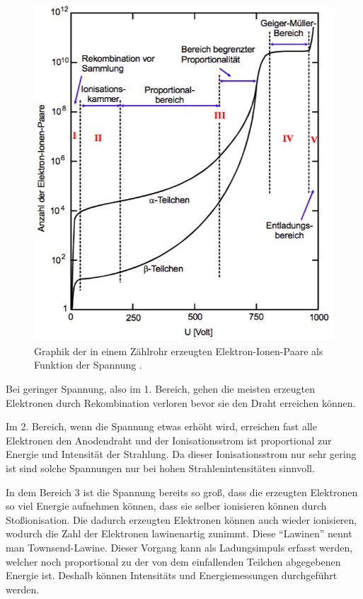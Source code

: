 \begin{figure}[H]
  \centering
  \includegraphics[width=\textwidth]{content/Primaerionisation.png}
  \caption{Graphik der in einem Zählrohr erzeugten Elektron-Ionen-Paare als Funktion
  der Spannung \cite{1}.}
  \label{abb:2}
\end{figure}

Bei geringer Spannung, also im 1. Bereich, gehen die meisten erzeugten Elektronen
durch Rekombination verloren bevor sie den Draht erreichen können.

Im 2. Bereich, wenn die Spannung etwas erhöht wird, erreichen fast alle Elektronen
den Anodendraht und der Ionisationsstrom ist proportional zur Energie und Intensität
der Strahlung. Da dieser Ionisationsstrom nur sehr gering ist sind solche Spannungen
nur bei hohen Strahlenintensitäten sinnvoll.

In dem Bereich 3 ist die Spannung bereits so groß, dass die erzeugten Elektronen
so viel Energie aufnehmen können, dass sie selber ionisieren können durch Stoßionisation.
Die dadurch erzeugten Elektronen können auch wieder ionisieren, wodurch die Zahl der Elektronen
lawinenartig zunimmt. Diese \enquote{Lawinen} nennt man Townsend-Lawine. Dieser Vorgang
kann als Ladungsimpuls erfasst werden, welcher noch proportional zu der von dem
einfallenden Teilchen abgegebenen Energie ist. Deshalb können Intensitäts und Energiemessungen
durchgeführt werden.

